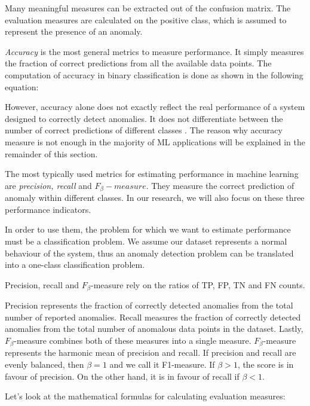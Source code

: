 Many meaningful measures can be extracted out of the confusion matrix. The evaluation measures are calculated on the positive class, which is assumed to represent the presence of an anomaly.

\textit{Accuracy} is the most general metrics to measure performance. It simply measures the fraction of correct predictions from all the available data points. The computation of accuracy in binary classification is done as shown in the following equation:


However, accuracy alone does not exactly reflect the real performance of a system designed to correctly detect anomalies. It does not differentiate between the number of correct predictions of different classes \cite{performanceEvaluation2006}. The reason why accuracy measure is not enough in the majority of ML applications will be explained in the remainder of this section. 

The most typically used metrics for estimating performance in machine learning are \textit{precision, recall} and ${F_{\beta}-measure}$. They measure the correct prediction of anomaly within different classes. In our research, we will also focus on these three  performance indicators.

In order to use them, the problem for which we want to estimate performance must be a classification problem. We assume our dataset represents a normal behaviour of the system, thus an anomaly detection problem can be translated into a one-class classification problem. 

Precision, recall and $F_{\beta}$-measure rely on the ratios of TP, FP, TN and FN counts. 

Precision represents the fraction of correctly detected anomalies from the total number of reported anomalies. Recall measures the fraction of correctly detected anomalies from the total number of anomalous data points in the dataset. Lastly, $F_{\beta}$-measure combines both of these measures into a single measure. $F_{\beta}$-measure represents the harmonic mean of precision and recall. If precision and recall are evenly balanced, then $\beta = 1$ and we call it F1-measure. If $\beta > 1$, the score is in favour of precision. On the other hand, it is in favour of recall if $\beta < 1$. 

Let's look at the mathematical formulas for calculating evaluation measures:

